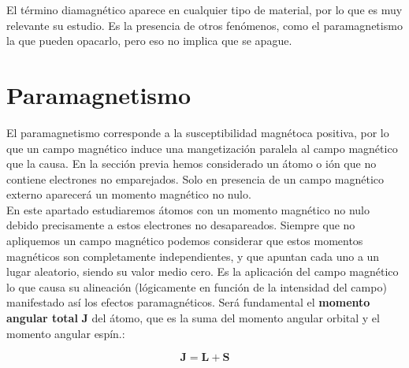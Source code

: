 \documentclass[12pt,a4paper]{book}
\numberwithin{equation}{section}
\numberwithin{figure}{section}
\newcommand{\Jn}{\mathbf{J}}
\newcommand{\Ln}{\mathbf{L}}
\newcommand{\Sn}{\mathbf{S}}
\begin{document}
El término diamagnético aparece en cualquier tipo de material, por lo que es muy relevante su estudio. Es la presencia de otros fenómenos, como el paramagnetismo la que pueden opacarlo, pero eso no implica que se apague.




\section{Paramagnetismo}

El paramagnetismo corresponde a la susceptibilidad magnétoca positiva, por lo que un campo magnético induce una mangetización paralela al campo magnético que la causa. En la sección previa hemos considerado un átomo o ión que no contiene electrones no emparejados. Solo en presencia de un campo magnético externo aparecerá un momento magnético no nulo.  \\

En este apartado estudiaremos átomos con un momento magnético no nulo debido precisamente a estos electrones no desapareados. Siempre que no apliquemos un campo magnético podemos considerar que estos momentos magnéticos son completamente independientes, y que apuntan cada uno a un lugar aleatorio, siendo su valor medio  cero. Es la aplicación del campo magnético lo que causa su alineación (lógicamente en función de la intensidad del campo) manifestado así los efectos paramagnéticos.  Será fundamental el \textbf{momento angular total} $\Jn$ del átomo, que es la suma del momento angular orbital y el momento angular espín.:

\begin{equation}
    \Jn = \Ln + \Sn
\end{equation}
\end{document}
